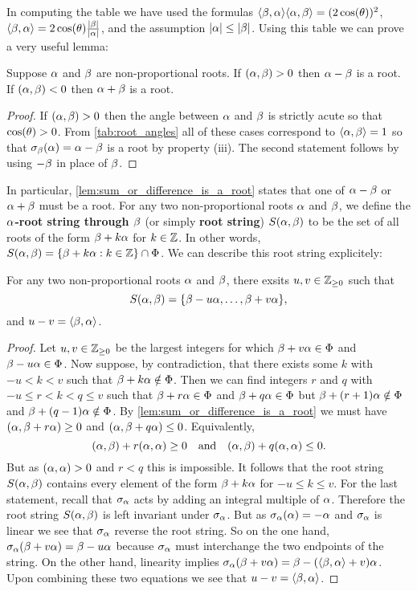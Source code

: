 \documentclass[12pt,reqno,oneside]{amsart}
\begin{document}
    In computing the table we have used the formulas $\langle\beta,\alpha\rangle\langle\alpha,\beta\rangle = (2\cos(\theta))^{2}$, $\langle\beta,\alpha\rangle = 2\cos(\theta)\frac{|\beta|}{|\alpha|}$, and the assumption $|\alpha| \le |\beta|$. Using this table we can prove a very useful lemma:

    \begin{lemma}\label{lem:sum_or_difference_is_a_root}
        Suppose $\alpha$ and $\beta$ are non-proportional roots. If $(\alpha,\beta) > 0$ then $\alpha-\beta$ is a root. If $(\alpha,\beta) < 0$ then $\alpha+\beta$ is a root.
    \end{lemma}
    \begin{proof}
        If $(\alpha,\beta) > 0$ then the angle between $\alpha$ and $\beta$ is strictly acute so that $\cos(\theta) > 0$. From \cref{tab:root_angles} all of these cases correspond to $\langle\alpha,\beta\rangle = 1$ so that $\sigma_{\beta}(\alpha) = \alpha-\beta$ is a root by property (iii). The second statement follows by using $-\beta$ in place of $\beta$.
    \end{proof}

    In particular, \cref{lem:sum_or_difference_is_a_root} states that one of $\alpha-\beta$ or $\alpha+\beta$ must be a root. For any two non-proportional roots $\alpha$ and $\beta$, we define the \textbf{$\alpha$-root string through $\beta$} (or simply \textbf{root string}) $S(\alpha,\beta)$ to be the set of all roots of the form $\beta+k\alpha$ for $k \in \mathbb{Z}$. In other words, $S(\alpha,\beta) = \{\beta+k\alpha:k \in \mathbb{Z}\} \cap \Phi $. We can describe this root string explicitely:

    \begin{proposition}\label{prop:sum_or_difference_is_a_root}
        For any two non-proportional roots $\alpha$ and $\beta$, there exsits $u,v \in \mathbb{Z}_{\ge 0}$ such that
        \[
            S(\alpha,\beta) = \{\beta-u\alpha,\ldots,\beta+v\alpha\},
        \]
        and $u-v = \langle\beta,\alpha\rangle$. 
    \end{proposition}
    \begin{proof}
        Let  $u,v \in \mathbb{Z}_{\ge 0}$ be the largest integers for which $\beta+v\alpha \in \Phi$ and $\beta-u\alpha \in \Phi$. Now suppose, by contradiction, that there exists some $k$ with $-u < k < v$ such that $\beta+k\alpha \notin \Phi$. Then we can find integers $r$ and $q$ with $-u \le r < k < q \le v$ such that $\beta+r\alpha \in \Phi$ and $\beta+q\alpha \in \Phi$ but $\beta+(r+1)\alpha \notin \Phi$ and $\beta+(q-1)\alpha \notin \Phi$. By \cref{lem:sum_or_difference_is_a_root} we must have $(\alpha,\beta+r\alpha) \ge 0$ and $(\alpha,\beta+q\alpha) \le 0$. Equivalently,
        \[
            (\alpha,\beta)+r(\alpha,\alpha) \ge 0 \quad \text{and} \quad (\alpha,\beta)+q(\alpha,\alpha) \le 0.
        \]
        But as $(\alpha,\alpha) > 0$ and $r < q$ this is impossible. It follows that the root string $S(\alpha,\beta)$ contains every element of the form $\beta+k\alpha$ for $-u \le k \le v$. For the last statement, recall that $\sigma_{\alpha}$ acts by adding an integral multiple of $\alpha$. Therefore the root string $S(\alpha,\beta)$ is left invariant under $\sigma_{\alpha}$. But as $\sigma_{\alpha}(\alpha) = -\alpha$ and $\sigma_{\alpha}$ is linear we see that $\sigma_{\alpha}$ reverse the root string. So on the one hand, $\sigma_{\alpha}(\beta+v\alpha) = \beta-u\alpha$ because $\sigma_{\alpha}$ must interchange the two endpoints of the string. On the other hand, linearity implies $\sigma_{\alpha}(\beta+v\alpha) = \beta-(\langle\beta,\alpha\rangle+v)\alpha$. Upon combining these two equations we see that $u-v = \langle\beta,\alpha\rangle$.
    \end{proof}
\end{document}
